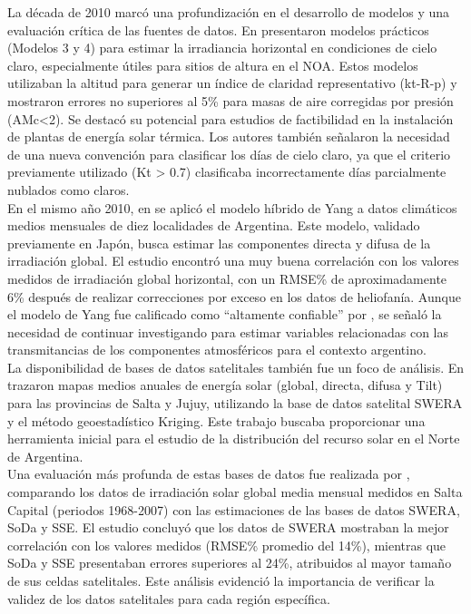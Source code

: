 La década de 2010 marcó una profundización en el desarrollo de modelos y una evaluación crítica de las fuentes de datos. En \cite{Salazar2010a} presentaron modelos prácticos (Modelos 3 y 4) para estimar la irradiancia horizontal en condiciones de cielo claro, especialmente útiles para sitios de altura en el NOA. Estos modelos utilizaban la altitud para generar un índice de claridad representativo (kt-R-p) y mostraron errores no superiores al 5\% para masas de aire corregidas por presión (AMc<2). Se destacó su potencial para estudios de factibilidad en la instalación de plantas de energía solar térmica. Los autores también señalaron la necesidad de una nueva convención para clasificar los días de cielo claro, ya que el criterio previamente utilizado (Kt > 0.7) clasificaba incorrectamente días parcialmente nublados como claros.\\

En el mismo año 2010, en \cite{Salazar2010b} se aplicó el modelo híbrido de Yang a datos climáticos medios mensuales de diez localidades de Argentina. Este modelo, validado previamente en Japón, busca estimar las componentes directa y difusa de la irradiación global. El estudio encontró una muy buena correlación con los valores medidos de irradiación global horizontal, con un RMSE\% de aproximadamente 6\% después de realizar correcciones por exceso en los datos de heliofanía. Aunque el modelo de Yang fue calificado como ``altamente confiable'' por \cite{Gueymard2003}, se señaló la necesidad de continuar investigando para estimar variables relacionadas con las transmitancias de los componentes atmosféricos para el contexto argentino.\\

La disponibilidad de bases de datos satelitales también fue un foco de análisis. En \cite{Laspiur2013} trazaron mapas medios anuales de energía solar (global, directa, difusa y Tilt) para las provincias de Salta y Jujuy, utilizando la base de datos satelital SWERA y el método geoestadístico Kriging. Este trabajo buscaba proporcionar una herramienta inicial para el estudio de la distribución del recurso solar en el Norte de Argentina.\\

Una evaluación más profunda de estas bases de datos fue realizada por \cite{Salazar2013}, comparando los datos de irradiación solar global media mensual medidos en Salta Capital (periodos 1968-2007) con las estimaciones de las bases de datos SWERA, SoDa y SSE. El estudio concluyó que los datos de SWERA mostraban la mejor correlación con los valores medidos (RMSE\% promedio del 14\%), mientras que SoDa y SSE presentaban errores superiores al 24\%, atribuidos al mayor tamaño de sus celdas satelitales. Este análisis evidenció la importancia de verificar la validez de los datos satelitales para cada región específica.\\ 

